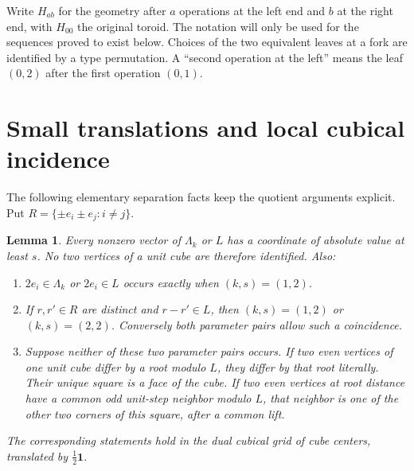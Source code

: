 \documentclass[11pt,a4paper]{article}
\newtheorem{lemma}[theorem]{Lemma}
\newcommand{\one}{\mathbf1}
\begin{document}
Write $H_{ab}$ for the geometry after $a$ operations at the left end
and $b$ at the right end, with $H_{00}$ the original toroid. The notation
will only be used for the sequences proved to exist below. Choices of
the two equivalent leaves at a fork are identified by a type
permutation. A ``second operation at the left'' means the leaf
$(0,2)$ after the first operation $(0,1)$.

\section{Small translations and local cubical incidence}
The following elementary separation facts keep the quotient arguments
explicit. Put $R=\{\pm e_i\pm e_j:i\ne j\}$.

\begin{lemma}\label{separation}
Every nonzero vector of $\Lambda_k$ or $L$ has a coordinate of absolute
value at least $s$. No two vertices of a unit cube are therefore
identified. Also:
\begin{enumerate}
\item $2e_i\in\Lambda_k$ or $2e_i\in L$ occurs exactly when
$(k,s)=(1,2)$.
\item If $r,r'\in R$ are distinct and $r-r'\in L$, then
$(k,s)=(1,2)$ or $(k,s)=(2,2)$. Conversely both parameter pairs
allow such a coincidence.
\item Suppose neither of these two parameter pairs occurs. If two
even vertices of one unit cube differ by a root modulo $L$, they
differ by that root literally. Their unique square is a face of
the cube. If two even vertices at root distance have a common odd
unit-step neighbor modulo $L$, that neighbor is one of the other
two corners of this square, after a common lift.
\end{enumerate}
The corresponding statements hold in the dual cubical grid of
cube centers, translated by $\frac12\one$.
\end{lemma}
\end{document}
